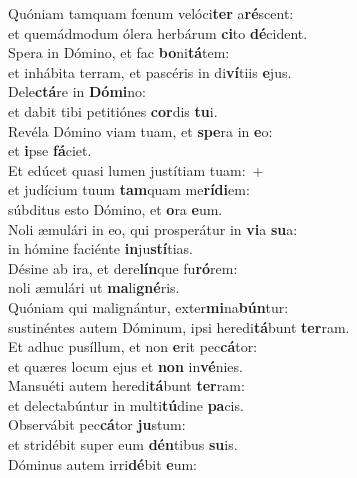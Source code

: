 \evenverse Quóniam tamquam fœnum velóci\textbf{ter} a\textbf{ré}scent:~\*\\
\evenverse et quemádmodum ólera herbárum \textbf{ci}to \textbf{dé}cident.\\
\oddverse Spera in Dómino, et fac \textbf{bo}ni\textbf{tá}tem:~\*\\
\oddverse et inhábita terram, et pascéris in di\textbf{ví}tiis \textbf{e}jus.\\
\evenverse Dele\textbf{ctá}re in \textbf{Dó}\textbf{mi}no:~\*\\
\evenverse et dabit tibi petitiónes \textbf{cor}dis \textbf{tu}i.\\
\oddverse Revéla Dómino viam tuam, et \textbf{spe}ra in \textbf{e}o:~\*\\
\oddverse et \textbf{i}pse \textbf{fá}ciet.\\
\evenverse Et edúcet quasi lumen justítiam tuam:~+\\
\evenverse  et judícium tuum \textbf{tam}quam me\textbf{rí}\textbf{di}em:~\*\\
\evenverse súbditus esto Dómino, et \textbf{o}ra \textbf{e}um.\\
\oddverse Noli æmulári in eo, qui prosperátur in \textbf{vi}a \textbf{su}a:~\*\\
\oddverse in hómine faciénte \textbf{in}ju\textbf{stí}tias.\\
\evenverse Désine ab ira, et dere\textbf{lín}que fu\textbf{ró}rem:~\*\\
\evenverse noli æmulári ut \textbf{ma}li\textbf{gné}ris.\\
\oddverse Quóniam qui malignántur, exter\textbf{mi}na\textbf{bún}tur:~\*\\
\oddverse sustinéntes autem Dóminum, ipsi heredi\textbf{tá}bunt \textbf{ter}ram.\\
\evenverse Et adhuc pusíllum, et non \textbf{e}rit pec\textbf{cá}tor:~\*\\
\evenverse et quæres locum ejus et \textbf{non} in\textbf{vé}nies.\\
\oddverse Mansuéti autem heredi\textbf{tá}bunt \textbf{ter}ram:~\*\\
\oddverse et delectabúntur in multi\textbf{tú}dine \textbf{pa}cis.\\
\evenverse Observábit pec\textbf{cá}tor \textbf{ju}stum:~\*\\
\evenverse et stridébit super eum \textbf{dén}tibus \textbf{su}is.\\
\oddverse Dóminus autem irri\textbf{dé}bit \textbf{e}um:~\*\\
